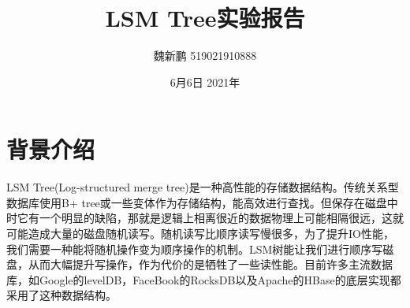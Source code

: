 \documentclass[fontset=windows]{article}
\title{LSM Tree实验报告}
\author{魏新鹏 519021910888}
\date{6月6日 2021年}
\begin{document}
\maketitle

\section{背景介绍}
LSM Tree(Log-structured merge tree)是一种高性能的存储数据结构。传统关系型数据库使用B+ tree或一些变体作为存储结构，能高效进行查找。但保存在磁盘中时它有一个明显的缺陷，那就是逻辑上相离很近的数据物理上可能相隔很远，这就可能造成大量的磁盘随机读写。随机读写比顺序读写慢很多，为了提升IO性能，我们需要一种能将随机操作变为顺序操作的机制。LSM树能让我们进行顺序写磁盘，从而大幅提升写操作，作为代价的是牺牲了一些读性能。目前许多主流数据库，如Google的levelDB，FaceBook的RocksDB以及Apache的HBase的底层实现都采用了这种数据结构。
\end{document}
